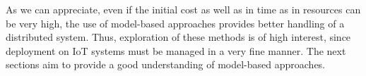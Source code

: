 As we can appreciate, even if the initial cost as well as in time as in resources can be very high, the use of model-based approaches provides better handling of a distributed system.
Thus, exploration of these methods is of high interest, since deployment on IoT systems must be managed in a very fine manner.
The next sections aim to provide a good understanding of model-based approaches.



